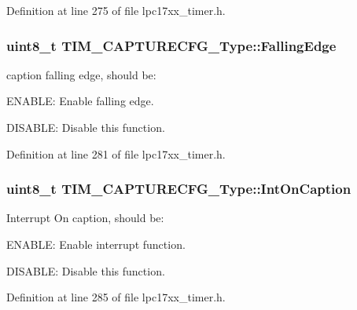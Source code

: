 \-Definition at line 275 of file lpc17xx\-\_\-timer.\-h.

\hypertarget{struct_t_i_m___c_a_p_t_u_r_e_c_f_g___type_ab05f10444c122dfb09c673e5705ac74d}{
\subsubsection[{\-Falling\-Edge}]{\setlength{\rightskip}{0pt plus 5cm}uint8\-\_\-t {\bf \-T\-I\-M\-\_\-\-C\-A\-P\-T\-U\-R\-E\-C\-F\-G\-\_\-\-Type\-::\-Falling\-Edge}}}\label{struct_t_i_m___c_a_p_t_u_r_e_c_f_g___type_ab05f10444c122dfb09c673e5705ac74d}
caption falling edge, should be\-:
\begin{DoxyItemize}
\item \-E\-N\-A\-B\-L\-E\-: \-Enable falling edge.
\item \-D\-I\-S\-A\-B\-L\-E\-: \-Disable this function. 
\end{DoxyItemize}

\-Definition at line 281 of file lpc17xx\-\_\-timer.\-h.

\hypertarget{struct_t_i_m___c_a_p_t_u_r_e_c_f_g___type_a5b7ba6329ccf91f68be78106c9572059}{
\subsubsection[{\-Int\-On\-Caption}]{\setlength{\rightskip}{0pt plus 5cm}uint8\-\_\-t {\bf \-T\-I\-M\-\_\-\-C\-A\-P\-T\-U\-R\-E\-C\-F\-G\-\_\-\-Type\-::\-Int\-On\-Caption}}}\label{struct_t_i_m___c_a_p_t_u_r_e_c_f_g___type_a5b7ba6329ccf91f68be78106c9572059}
\-Interrupt \-On caption, should be\-:
\begin{DoxyItemize}
\item \-E\-N\-A\-B\-L\-E\-: \-Enable interrupt function.
\item \-D\-I\-S\-A\-B\-L\-E\-: \-Disable this function. 
\end{DoxyItemize}

\-Definition at line 285 of file lpc17xx\-\_\-timer.\-h.

